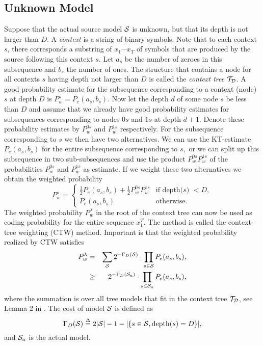 \documentclass[10pt,conference]{IEEEtran}
\newcommand{\xT}{x^{T}_{1}}
\newcommand{\half}{\frac{1}{2}}
\newcommand{\cS}{{\cal{S}}}
\newcommand{\cTD}{{\cal{T}_{D}}}
\newcommand{\define}{\stackrel{\Delta}{=}}
\newcommand{\GD}{{\Gamma_{D}}}
\begin{document}
\subsection{Unknown Model}
Suppose that the actual source model $\cS$ is unknown, but that its depth is not larger than $D$.
A {\em context} is a string of binary symbols.
Note that to each context $s$, there corresponds a substring of $x_{1}\cdots x_{T}$ of symbols that are produced by the source following this context $s$.
Let $a_{s}$ be the number of zeroes in this subsequence and $b_{s}$ the number of ones.
The structure that contains a node for all contexts $s$ having depth not larger than $D$ is called the {\em context tree} $\cTD$.
A good probability estimate for the subsequence corresponding to a context (node) $s$ at depth $D$ is $P_{w}^{s} = P_{e}(a_{s},b_{s})$.
Now let the depth $d$ of some node $s$ be less than $D$ and assume that we already have good probability estimates for subsequences corresponding to nodes $0s$ and $1s$ at depth $d+1$.
Denote these probability estimates by $P_{w}^{0s}$ and $P^{1s}_{w}$ respectively.
For the subsequence corresponding to $s$ we then have two alternatives.
We can use the KT-estimate $P_{e}(a_{s},b_{s})$ for the entire subsequence corresponding to $s,$ or we can split up this subsequence in two sub-subsequences and use the product $P_{w}^{0s}P_{w}^{1s}$ of the probabilities $P_{w}^{0s}$ and $P_{w}^{1s}$ as estimate.
If we weight these two alternatives we obtain the weighted probability
\begin{equation}\label{def:CTW}
P_{w}^{s} = \left\{\begin{array}{ll}
                \half P_{e}(a_{s},b_{s}) + \half P_{w}^{0s} P_{w}^{1s}
                &\mbox{if depth($s$) $<D$}, \\
               P_{e}(a_{s},b_{s}) &\mbox{otherwise.}
                 \end{array} \right.
\end{equation}
The weighted probability $P_{w}^{\lambda}$ in the root of the context tree can now be used as coding probability for the entire sequence $\xT$.
The method is called the context-tree weighting (CTW) method.
Important is that the weighted probability realized by CTW satisfies
\begin{eqnarray}
P_{w}^{\lambda}
&=& \sum_{\cS} 2^{-\GD(\cS)} \cdot \prod_{s\in\cS} P_{e}(a_s,b_s), \nonumber \\
&\geq& 2^{-\GD(\cS_a)} \cdot \prod_{s\in\cS_a} P_{e}(a_s,b_s), \label{eq:bndcodprobwei}
\end{eqnarray}
where the summation is over all tree models that fit in the context tree $\cTD$, see Lemma 2 in \cite{WilShtTja95}.
The cost of model $\cS$ is defined as
\begin{equation}
\GD(\cS) \define 2|\cS| - 1 - |\{ s\in\cS, \mbox{depth$(s) = D$} \}|, \label{eq:defcost}
\end{equation}
and $\cS_a$ is the actual model.
\end{document}

